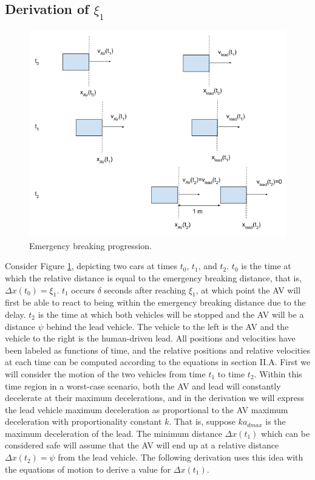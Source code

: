 \documentclass[conference]{IEEEtran}
\begin{document}
\begin{appendix}
\subsection{Derivation of $\xi_1$}

\begin{figure}[htbp]
\centerline{\includegraphics[width=6 in]{xiDerivation.png}}
\caption{Emergency breaking progression.}
\label{fig2}
\end{figure}

Consider Figure \ref{fig2}, depicting two cars at times $t_0$, $t_1$, and $t_2$. $t_0$ is the time at which the relative distance is equal to the emergency breaking distance, that is, $\Delta x(t_0)=\xi_1$. $t_1$ occurs $\delta$ seconds after reaching $\xi_1$, at which point the AV will first be able to react to being within the emergency breaking distance due to the delay. $t_2$ is the time at which both vehicles will be stopped and the AV will be a distance $\psi$ behind the lead vehicle. The vehicle to the left is the AV and the vehicle to the right is the human-driven lead. All positions and velocities have been labeled as functions of time, and the relative positions and relative velocities at each time can be computed according to the equations in section II.A. First we will consider the motion of the two vehicles from time $t_1$ to time $t_2$. Within this time region in a worst-case scenario, both the AV and lead will constantly decelerate at their maximum decelerations, and in the derivation we will express the lead vehicle maximum deceleration as proportional to the AV maximum deceleration with proportionality constant $k$. That is, suppose $ka_{dmax}$ is the maximum deceleration of the lead. The minimum distance $\Delta x(t_1)$ which can be considered safe will assume that the AV will end up at a relative distance $\Delta x(t_2)= \psi$ from the lead vehicle. The following derivation uses this idea with the equations of motion to derive a value for $\Delta x(t_1)$.


\end{appendix}
\end{document}
